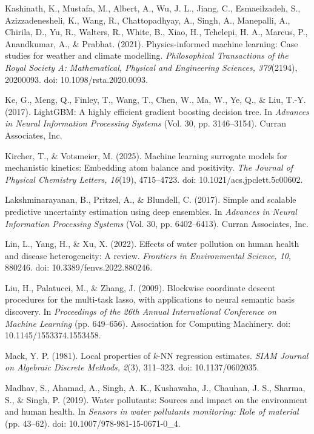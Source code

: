 \documentclass[a4paper,fleqn]{cas-sc}
\begin{document}
\noindent Kashinath, K., Mustafa, M., Albert, A., Wu, J. L., Jiang, C., Esmaeilzadeh, S., Azizzadenesheli, K., Wang, R., Chattopadhyay, A., Singh, A., Manepalli, A., Chirila, D., Yu, R., Walters, R., White, B., Xiao, H., Tchelepi, H. A., Marcus, P., Anandkumar, A., \& Prabhat. (2021). Physics-informed machine learning: Case studies for weather and climate modelling. \textit{Philosophical Transactions of the Royal Society A: Mathematical, Physical and Engineering Sciences, 379}(2194), 20200093. doi: 10.1098/rsta.2020.0093.

\noindent Ke, G., Meng, Q., Finley, T., Wang, T., Chen, W., Ma, W., Ye, Q., \& Liu, T.-Y. (2017). LightGBM: A highly efficient gradient boosting decision tree. In \textit{Advances in Neural Information Processing Systems} (Vol. 30, pp. 3146--3154). Curran Associates, Inc.

\noindent Kircher, T., \& Votsmeier, M. (2025). Machine learning surrogate models for mechanistic kinetics: Embedding atom balance and positivity. \textit{The Journal of Physical Chemistry Letters, 16}(19), 4715--4723. doi: 10.1021/acs.jpclett.5c00602.

\noindent Lakshminarayanan, B., Pritzel, A., \& Blundell, C. (2017). Simple and scalable predictive uncertainty estimation using deep ensembles. In \textit{Advances in Neural Information Processing Systems} (Vol. 30, pp. 6402--6413). Curran Associates, Inc.

\noindent Lin, L., Yang, H., \& Xu, X. (2022). Effects of water pollution on human health and disease heterogeneity: A review. \textit{Frontiers in Environmental Science, 10}, 880246. doi: 10.3389/fenvs.2022.880246.

\noindent Liu, H., Palatucci, M., \& Zhang, J. (2009). Blockwise coordinate descent procedures for the multi-task lasso, with applications to neural semantic basis discovery. In \textit{Proceedings of the 26th Annual International Conference on Machine Learning} (pp. 649--656). Association for Computing Machinery. doi: 10.1145/1553374.1553458.

\noindent Mack, Y. P. (1981). Local properties of $k$-NN regression estimates. \textit{SIAM Journal on Algebraic Discrete Methods, 2}(3), 311--323. doi: 10.1137/0602035.

\noindent Madhav, S., Ahamad, A., Singh, A. K., Kushawaha, J., Chauhan, J. S., Sharma, S., \& Singh, P. (2019). Water pollutants: Sources and impact on the environment and human health. In \textit{Sensors in water pollutants monitoring: Role of material} (pp. 43--62). doi: 10.1007/978-981-15-0671-0\_4.
\end{document}
